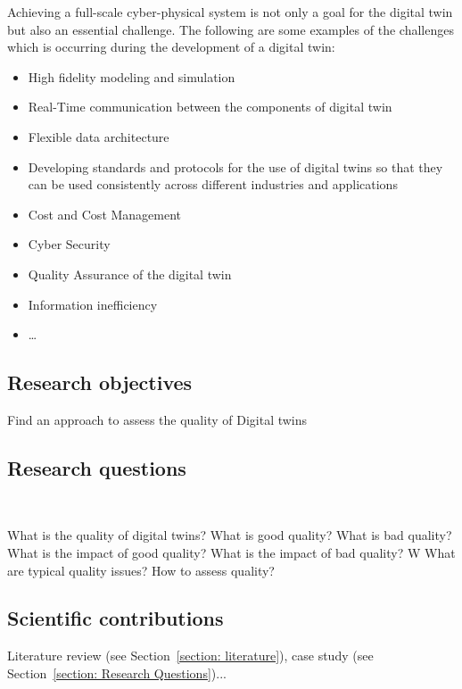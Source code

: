 \documentclass[9pt,conference]{IEEEtran}
\begin{document}
    Achieving a full-scale cyber-physical system is not only a goal for the digital twin but also an essential challenge. The following are some examples of the challenges which is occurring during the development of a digital twin:
    \begin{itemize}
        \item High fidelity modeling and simulation
        \item Real-Time communication between the components of digital twin 
        \item Flexible data architecture
        \item Developing standards and protocols for the use of digital twins so that they can be used consistently across different 
        industries and applications
        \item Cost and Cost Management
        \item Cyber Security
        \item Quality Assurance of the digital twin
        \item Information inefficiency
        \item \dots{}
    \end{itemize}
    
    \subsection{Research objectives}
    
    Find an approach to assess the quality of Digital twins

    \subsection{Research questions}~\label{section: Research Questions}

    What is the quality of digital twins? 
    What is good quality?
    What is bad quality? 
    What is the impact of good quality? 
    What is the impact of bad quality? W
    What are typical quality issues? 
    How to assess quality?

    \subsection{Scientific contributions}

    Literature review (see Section~\ref{section: literature}), case study (see Section~\ref{section: Research Questions})...
    
\end{document}

